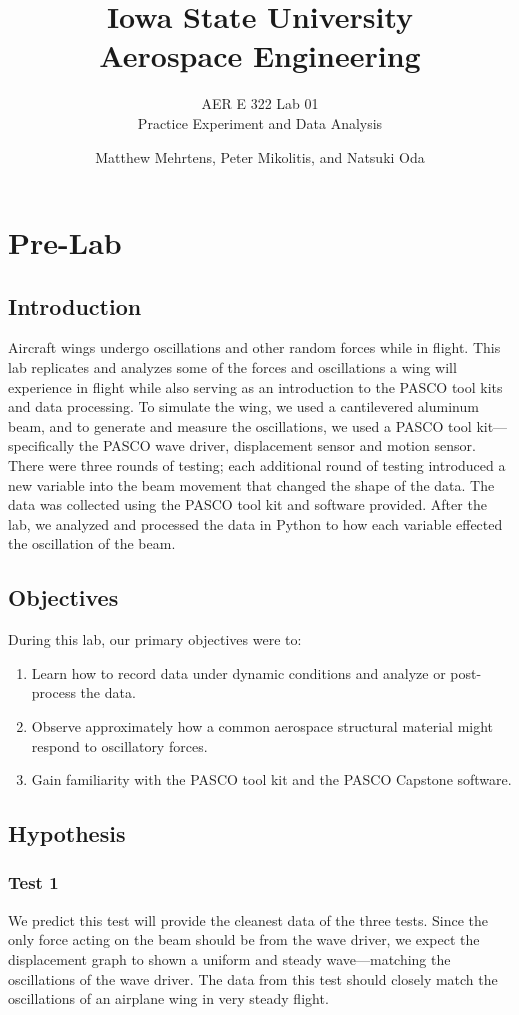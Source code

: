 \documentclass[12 pt]{report}
\title{\textbf{Iowa State University
\\{\Large Aerospace Engineering}}}
\subtitle{AER E 322 Lab 01\\
		  Practice Experiment and Data Analysis}
\author{Matthew Mehrtens, Peter Mikolitis, and Natsuki Oda}
\begin{document}
\maketitle
\tableofcontents

\chapter{Pre-Lab} \label{pre-lab}
\section{Introduction} \label{introduction}
Aircraft wings undergo oscillations and other random forces while in flight. This lab replicates and analyzes some of the forces and oscillations a wing will experience in flight while also serving as an introduction to the PASCO tool kits and data processing. To simulate the wing, we used a cantilevered aluminum beam, and to generate and measure the oscillations, we used a PASCO tool kit---specifically the PASCO wave driver, displacement sensor and motion sensor. There were three rounds of testing; each additional round of testing introduced a new variable into the beam movement that changed the shape of the data. The data was collected using the PASCO tool kit and software provided. After the lab, we analyzed and processed the data in Python to how each variable effected the oscillation of the beam.

\section{Objectives} \label{objectives}
During this lab, our primary objectives were to:
\begin{enumerate}
	\item Learn how to record data under dynamic conditions and analyze or post-process the data.
	\item Observe approximately how a common aerospace structural material might respond to oscillatory forces.
	\item Gain familiarity with the PASCO tool kit and the PASCO Capstone software.
\end{enumerate}

\section{Hypothesis} \label{hypothesis}
\subsection{Test 1} \label{hypothesis-test_1}
We predict this test will provide the cleanest data of the three tests. Since the only force acting on the beam should be from the wave driver, we expect the displacement graph to shown a uniform and steady wave---matching the oscillations of the wave driver. The data from this test should closely match the oscillations of an airplane wing in very steady flight.
\end{document}
